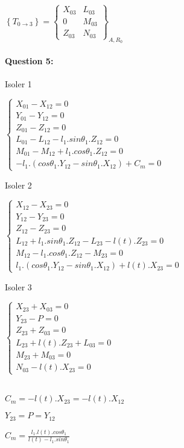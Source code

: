 $\left\{T_{0\rightarrow 3}\right\}=\left\{\begin{array}{cc}
X_{03} & L_{03} \\
0 & M_{03} \\
Z_{03} & N_{03}
\end{array}\right\}_{A,R_0}$

\paragraph{Question 5:}

Isoler 1

$\left\{\begin{array}{l}
X_{01}-X_{12}=0 \\
Y_{01}-Y_{12}=0 \\
Z_{01}-Z_{12}=0 \\
L_{01}-L_{12}-l_1.sin\theta_1.Z_{12}=0 \\
M_{01}-M_{12}+l_1.cos\theta_1.Z_{12}=0 \\
-l_1.(cos\theta_1.Y_{12}-sin\theta_1.X_{12})+C_m=0
\end{array}\right.$

Isoler 2

$\left\{\begin{array}{l}
X_{12}-X_{23}=0 \\
Y_{12}-Y_{23}=0 \\
Z_{12}-Z_{23}=0 \\
L_{12}+l_1.sin\theta_1.Z_{12}-L_{23}-l(t).Z_{23}=0 \\
M_{12}-l_1.cos\theta_1.Z_{12}-M_{23}=0 \\
l_1.(cos\theta_1.Y_{12}-sin\theta_1.X_{12})+l(t).X_{23}=0
\end{array}\right.$

Isoler 3

$\left\{\begin{array}{l}
X_{23}+X_{03}=0 \\
Y_{23}-P=0 \\
Z_{23}+Z_{03}=0 \\
L_{23}+l(t).Z_{23}+L_{03}=0 \\
M_{23}+M_{03}=0 \\
N_{03}-l(t).X_{23}=0
\end{array}\right.$

~\ \\
$C_m=-l(t).X_{23}=-l(t).X_{12}$

$Y_{23}=P=Y_{12}$

$C_m=\frac{l_1.l(t).cos\theta_1}{l(t)-l_1.sin\theta_1}$



